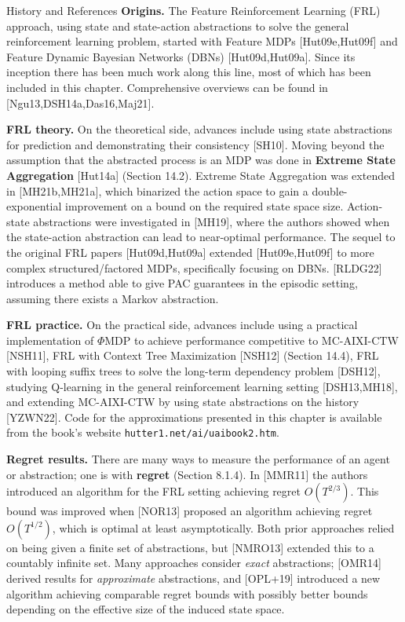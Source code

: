 \documentclass[aspectratio=169,10pt]{beamer}
\begin{document}
\begin{frame}[allowframebreaks]{History and References}
  \textbf{Origins.} The Feature Reinforcement Learning (FRL) approach,
  using state and state-action abstractions to solve the general
  reinforcement learning problem, started with Feature MDPs
  [Hut09e,Hut09f] and Feature Dynamic Bayesian Networks (DBNs)
  [Hut09d,Hut09a]. Since its inception there has been much work along
  this line, most of which has been included in this chapter.
  Comprehensive overviews can be found in [Ngu13,DSH14a,Das16,Maj21].

  \vspace{0.4em}
  \textbf{FRL theory.} On the theoretical side, advances include using
  state abstractions for prediction and demonstrating their consistency
  [SH10]. Moving beyond the assumption that the abstracted process is an
  MDP was done in \textbf{Extreme State Aggregation} [Hut14a] (Section
  14.2). Extreme State Aggregation was extended in [MH21b,MH21a], which
  binarized the action space to gain a double-exponential improvement on
  a bound on the required state space size. Action-state abstractions
  were investigated in [MH19], where the authors showed when the
  state-action abstraction can lead to near-optimal performance. The
  sequel to the original FRL papers [Hut09d,Hut09a] extended [Hut09e,Hut09f]
  to more complex structured/factored MDPs, specifically focusing on
  DBNs. [RLDG22] introduces a method able to give PAC guarantees in the
  episodic setting, assuming there exists a Markov abstraction.

  \framebreak

  \textbf{FRL practice.} On the practical side, advances include using a
  practical implementation of $\Phi$MDP to achieve performance
  competitive to MC-AIXI-CTW [NSH11], FRL with Context Tree Maximization
  [NSH12] (Section 14.4), FRL with looping suffix trees to solve the
  long-term dependency problem [DSH12], studying Q-learning in the
  general reinforcement learning setting [DSH13,MH18], and extending
  MC-AIXI-CTW by using state abstractions on the history [YZWN22]. Code
  for the approximations presented in this chapter is available from the
  book's website \texttt{hutter1.net/ai/uaibook2.htm}.

  \vspace{0.4em}
  \textbf{Regret results.} There are many ways to measure the performance
  of an agent or abstraction; one is with \textbf{regret} (Section
  8.1.4). In [MMR11] the authors introduced an algorithm for the FRL
  setting achieving regret $O(T^{2/3})$. This bound was improved when
  [NOR13] proposed an algorithm achieving regret $O(T^{1/2})$, which is
  optimal at least asymptotically. Both prior approaches relied on being
  given a finite set of abstractions, but [NMRO13] extended this to a
  countably infinite set. Many approaches consider \emph{exact}
  abstractions; [OMR14] derived results for \emph{approximate}
  abstractions, and [OPL+19] introduced a new algorithm achieving
  comparable regret bounds with possibly better bounds depending on the
  effective size of the induced state space.


\end{frame}
\end{document}
